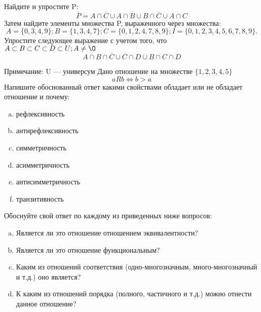 \documentclass[10pt]{exam}
\begin{document}
\begin{questions}
\question
Найдите и упростите P:
\begin{equation*}
\overline{P} = A \cap \overline{C} \cup A \cap \overline{B} \cup B \cap \overline{C} \cup A \cap C
\end{equation*}
Затем найдите элементы множества P, выраженного через множества:
\begin{equation*}
A = \{0, 3, 4, 9\}; 
B = \{1, 3, 4, 7\};
C = \{0, 1, 2, 4, 7, 8, 9\};
I = \{0, 1, 2, 3, 4, 5, 6, 7, 8, 9\}.
\end{equation*}\question
Упростите следующее выражение с учетом того, что $A\subset B \subset C \subset D \subset U; A \neq \O$
\begin{equation*}
A \cap B  \cap \overline{C} \cup \overline{C} \cap D \cup B \cap C \cap D
\end{equation*}

Примечание: U — универсум\question
Дано отношение на множестве $\{1, 2, 3, 4, 5\}$ 
\begin{equation*}
aRb \iff b > a
\end{equation*}
Напишите обоснованный ответ какими свойствами обладает или не обладает отношение и почему:   
\begin{enumerate} [a)]\setcounter{enumi}{0}
\item рефлексивность
\item антирефлексивность
\item симметричность
\item асимметричность
\item антисимметричность
\item транзитивность
\end{enumerate}

Обоснуйте свой ответ по каждому из приведенных ниже вопросов:
\begin{enumerate} [a)]\setcounter{enumi}{0}
    \item Является ли это отношение отношением эквивалентности?
    \item Является ли это отношение функциональным?
    \item Каким из отношений соответствия (одно-многозначным, много-многозначный и т.д.) оно является?
    \item К каким из отношений порядка (полного, частичного и т.д.) можно отнести данное отношение?
\end{enumerate}


\end{questions}
\end{document}
